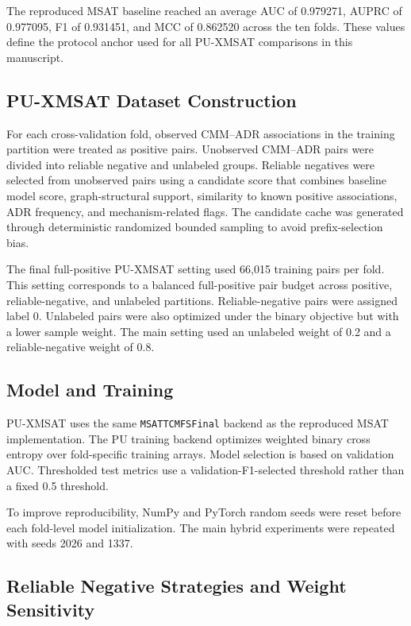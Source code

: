 \documentclass[manuscript,screen,review]{acmart}
\newcommand{\msat}{MSAT}
\newcommand{\px}{PU-XMSAT}
\begin{document}
The reproduced \msat{} baseline reached an average AUC of 0.979271, AUPRC of 0.977095, F1 of 0.931451, and MCC of 0.862520 across the ten folds. These values define the protocol anchor used for all \px{} comparisons in this manuscript.

\subsection{\px{} Dataset Construction}

For each cross-validation fold, observed CMM--ADR associations in the training partition were treated as positive pairs. Unobserved CMM--ADR pairs were divided into reliable negative and unlabeled groups. Reliable negatives were selected from unobserved pairs using a candidate score that combines baseline model score, graph-structural support, similarity to known positive associations, ADR frequency, and mechanism-related flags. The candidate cache was generated through deterministic randomized bounded sampling to avoid prefix-selection bias.

The final full-positive \px{} setting used 66,015 training pairs per fold. This setting corresponds to a balanced full-positive pair budget across positive, reliable-negative, and unlabeled partitions. Reliable-negative pairs were assigned label 0. Unlabeled pairs were also optimized under the binary objective but with a lower sample weight. The main setting used an unlabeled weight of 0.2 and a reliable-negative weight of 0.8.

\subsection{Model and Training}

\px{} uses the same \texttt{MSATTCMFSFinal} backend as the reproduced \msat{} implementation. The PU training backend optimizes weighted binary cross entropy over fold-specific training arrays. Model selection is based on validation AUC. Thresholded test metrics use a validation-F1-selected threshold rather than a fixed 0.5 threshold.

To improve reproducibility, NumPy and PyTorch random seeds were reset before each fold-level model initialization. The main hybrid experiments were repeated with seeds 2026 and 1337.

\subsection{Reliable Negative Strategies and Weight Sensitivity}
\end{document}

